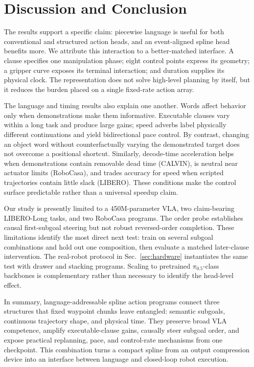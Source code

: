 \section{Discussion and Conclusion}
\label{sec:discussion}

The results support a specific claim: piecewise language is useful for both conventional and structured action heads, and an event-aligned spline head benefits more. We attribute this interaction to a better-matched interface. A clause specifies one manipulation phase; eight control points express its geometry; a gripper curve exposes its terminal interaction; and duration supplies its physical clock. The representation does not solve high-level planning by itself, but it reduces the burden placed on a single fixed-rate action array.

The language and timing results also explain one another. Words affect behavior only when demonstrations make them informative. Executable clauses vary within a long task and produce large gains; speed adverbs label physically different continuations and yield bidirectional pace control. By contrast, changing an object word without counterfactually varying the demonstrated target does not overcome a positional shortcut. Similarly, decode-time acceleration helps when demonstrations contain removable dead time (CALVIN), is neutral near actuator limits (RoboCasa), and trades accuracy for speed when scripted trajectories contain little slack (LIBERO). These conditions make the control surface predictable rather than a universal speedup claim.

Our study is presently limited to a 450M-parameter VLA, two claim-bearing LIBERO-Long tasks, and two RoboCasa programs. The order probe establishes causal first-subgoal steering but not robust reversed-order completion. These limitations identify the most direct next test: train on several subgoal combinations and hold out one composition, then evaluate a matched later-clause intervention. The real-robot protocol in Sec.~\ref{sec:hardware} instantiates the same test with drawer and stacking programs. Scaling \method{} to pretrained $\pi_{0.5}$-class backbones is complementary rather than necessary to identify the head-level effect.

In summary, language-addressable spline action programs connect three structures that fixed waypoint chunks leave entangled: semantic subgoals, continuous trajectory shape, and physical time. They preserve broad VLA competence, amplify executable-clause gains, causally steer subgoal order, and expose practical replanning, pace, and control-rate mechanisms from one checkpoint. This combination turns a compact spline from an output compression device into an interface between language and closed-loop robot execution.
